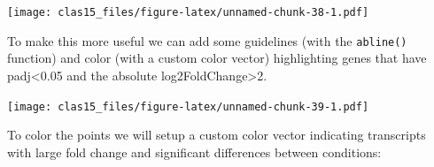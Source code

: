 \documentclass[
]{article}
\newenvironment{Shaded}{\begin{snugshade}}{\end{snugshade}}
\newcommand{\AttributeTok}[1]{\textcolor[rgb]{0.77,0.63,0.00}{#1}}
\newcommand{\CommentTok}[1]{\textcolor[rgb]{0.56,0.35,0.01}{\textit{#1}}}
\newcommand{\DecValTok}[1]{\textcolor[rgb]{0.00,0.00,0.81}{#1}}
\newcommand{\FloatTok}[1]{\textcolor[rgb]{0.00,0.00,0.81}{#1}}
\newcommand{\FunctionTok}[1]{\textcolor[rgb]{0.00,0.00,0.00}{#1}}
\newcommand{\NormalTok}[1]{#1}
\newcommand{\SpecialCharTok}[1]{\textcolor[rgb]{0.00,0.00,0.00}{#1}}
\newcommand{\StringTok}[1]{\textcolor[rgb]{0.31,0.60,0.02}{#1}}
\begin{document}
\begin{Shaded}
\end{Shaded}

\texttt{[image: clas15\_files/figure-latex/unnamed-chunk-38-1.pdf]}

To make this more useful we can add some guidelines (with the
\texttt{abline()} function) and color (with a custom color vector)
highlighting genes that have padj\textless0.05 and the absolute
log2FoldChange\textgreater2.

\begin{Shaded}
\end{Shaded}

\texttt{[image: clas15\_files/figure-latex/unnamed-chunk-39-1.pdf]}

To color the points we will setup a custom color vector indicating
transcripts with large fold change and significant differences between
conditions:
\end{document}
